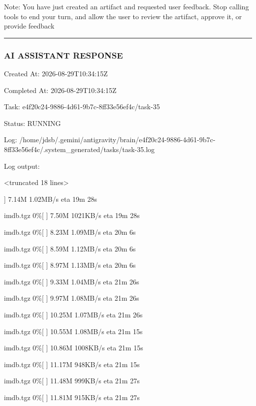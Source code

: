 \documentclass[11pt,a4paper]{article}
\begin{document}
Note: You have just created an artifact and requested user feedback. Stop calling tools to end your turn, and allow the user to review the artifact, approve it, or provide feedback


\hrule

\subsubsection{AI ASSISTANT RESPONSE}

Created At: 2026-08-29T10:34:15Z

Completed At: 2026-08-29T10:34:15Z

Task: e4f20c24-9886-4d61-9b7c-8ff33e56ef4c/task-35

Status: RUNNING

Log: /home/jdsb/.gemini/antigravity/brain/e4f20c24-9886-4d61-9b7c-8ff33e56ef4c/.system\_generated/tasks/task-35.log

Log output:

<truncated 18 lines>

]   7.14M  1.02MB/s    eta 19m 28s

imdb.tgz              0\%[                    ]   7.50M  1021KB/s    eta 19m 28s

imdb.tgz              0\%[                    ]   8.23M  1.09MB/s    eta 20m 6s

imdb.tgz              0\%[                    ]   8.59M  1.12MB/s    eta 20m 6s

imdb.tgz              0\%[                    ]   8.97M  1.13MB/s    eta 20m 6s

imdb.tgz              0\%[                    ]   9.33M  1.04MB/s    eta 21m 26s

imdb.tgz              0\%[                    ]   9.97M  1.08MB/s    eta 21m 26s

imdb.tgz              0\%[                    ]  10.25M  1.07MB/s    eta 21m 26s

imdb.tgz              0\%[                    ]  10.55M  1.08MB/s    eta 21m 15s

imdb.tgz              0\%[                    ]  10.86M  1008KB/s    eta 21m 15s

imdb.tgz              0\%[                    ]  11.17M   948KB/s    eta 21m 15s

imdb.tgz              0\%[                    ]  11.48M   999KB/s    eta 21m 27s

imdb.tgz              0\%[                    ]  11.81M   915KB/s    eta 21m 27s
\end{document}
